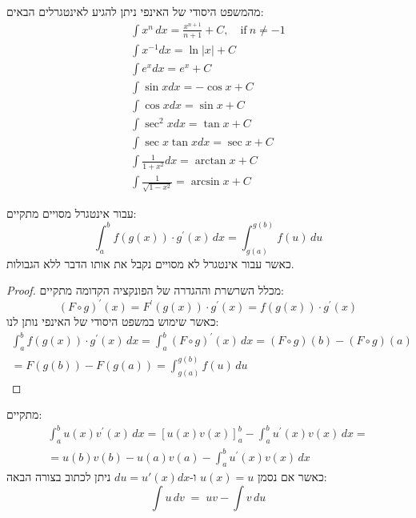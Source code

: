 \documentclass{tstextbook}
\begin{document}
\begin{proposition}
מהמשפט היסודי של האינפי ניתן להגיע לאינטגרלים הבאים:
\begin{gather*}\int x^{n}\,d x={\frac{x^{n+1}}{n+1}}+C,\quad{\mathrm{if~}}n\neq-1 \\\int{x}^{{-{{1}}}}{\left.{d}{x}\right.}={\ln{{\left|{x}\right|}}}+{C}\\\int{e}^{{{x}}}{\left.{d}{x}\right.}={e}^{{{x}}}+{C}\\\int\sin{{x}}{\left.{d}{x}\right.}=-\cos{{x}}+{C}\\\int\cos{{x}}{\left.{d}{x}\right.}={\sin{{x}}}+{C}\\\int{{\sec}^{{{2}}}{x}}{\left.{d}{x}\right.}={\tan{{x}}}+{C}\\\int{\sec{{x}}}{\tan{{x}}}{\left.{d}{x}\right.}={\sec{{x}}}+{C}\\\int{\frac{{{1}}}{{{1}+{x}^{{{2}}}}}}{\left.{d}{x}\right.}={\arctan{{x}}}+{C}\\\int{\frac{{{1}}}{{\sqrt{{{1}-{x}^{{{2}}}}}}}}=\arcsin x+C
\end{gather*}

\end{proposition}
\begin{proposition}
עבור אינטגרל מסויים מתקיים:
$$\int_{a}^{b}f(g(x))\cdot g^{\prime}(x)\,d x=\int_{g(a)}^{g(b)}f(u)\,d u$$
כאשר עבור אינטגרל לא מסויים נקבל את אותו הדבר ללא הגבולות.

\end{proposition}
\begin{proof}
מכלל השרשרת וההגדרה של הפונקציה הקדומה מתקיים:
$$(F\circ g)^{\prime}(x)=F^{\prime}(g(x))\cdot g^{\prime}(x)=f(g(x))\cdot g^{\prime}(x)$$
כאשר שימוש במשפט היסודי של האינפי נותן לנו:
\begin{gather*}{{\int_{a}^{b}f(g(x))\cdot g^{\prime}(x)\,d x=\int_{a}^{b}(F\circ g)^{\prime}(x)\,d x}} {{=(F\circ g)(b)-(F\circ g)(a)}}\\ {{=F(g(b))-F(g(a))}} {{=\int_{g(a)}^{g(b)}f(u)\,d u}}\end{gather*}

\end{proof}
\begin{proposition}
מתקיים:
\begin{gather*}\int_{a}^{b}u(x)v^{\prime}(x)\,dx=\left[u(x)v(x)\right]_{a}^{b}-\int_{a}^{b}u^{\prime}(x)v(x)\,dx=\\=u(b)v(b)-u(a)v(a)-\int_{a}^{b}u^{\prime}(x)v(x)\,dx 
\end{gather*}
כאשר אם נסמן \(u(x)=u\) ו-\(du=u'(x)dx\) ניתן לכתוב בצורה הבאה:
$$\int u\,d v\;=\;u v-\int v\,d u$$

\end{proposition}
\end{document}
